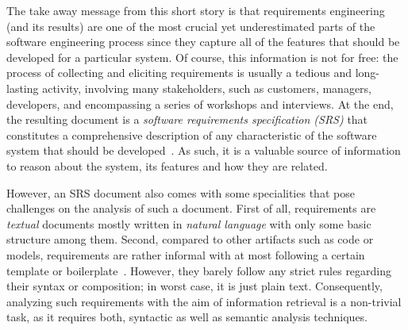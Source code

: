 \documentclass[graybox]{svmult}
\begin{document}
The take away message from this short story is that requirements engineering (and its results) are one of the most crucial yet underestimated parts of the software engineering process since they capture all of the features that should be developed for a particular system.
Of course, this information is not for free: the process of collecting and eliciting requirements is usually a tedious and long-lasting activity, involving many stakeholders, such as customers, managers, developers, and encompassing a series of workshops and interviews.
At the end, the resulting document is a \textit{software requirements specification (SRS)} that constitutes a comprehensive description of any characteristic of the software system that should be developed~\cite{IEEE98}.
As such, it is a valuable source of information to reason about the system, its features and how they are related.

However, an SRS document also comes with some specialities that pose challenges on the analysis of such a document.
First of all, requirements are \textit{textual} documents mostly written in \textit{natural language} with only some basic structure among them. 
Second, compared to other artifacts such as code or models, requirements are rather informal with at most following a certain template or boilerplate~\cite{IEEE98}.
However, they barely follow any strict rules regarding their syntax or composition; in worst case, it is just plain text.
Consequently, analyzing such requirements with the aim of information retrieval is a non-trivial task, as it requires both, syntactic as well as semantic analysis techniques.
\end{document}

